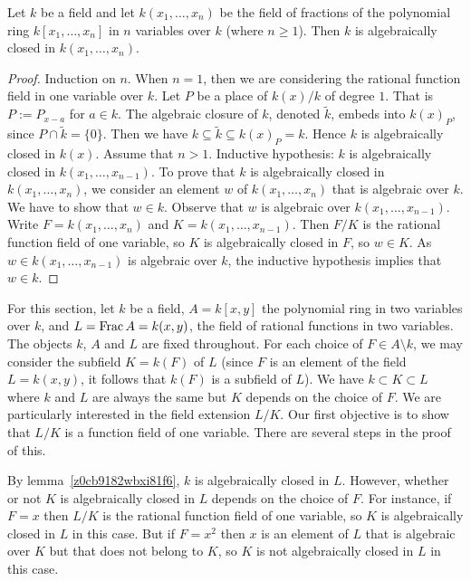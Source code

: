 \begin{lemma} \label {z0cb9182wbxi81f6}
	Let $k$ be a field and let $k(x_1, \dots, x_n)$ be 
	the field of fractions of the
	polynomial ring  $k[x_1, \dots, x_n]$ in $n$ variables 
	over $k$ (where $n \ge 1$).
	Then $k$ is algebraically closed in $k(x_1, \dots, x_n)$.
\end{lemma}

\begin{proof}
	Induction on $n$. When $n= 1$, then we are considering 
	the rational function field in one variable over $k $.
	Let $P$ be a place of $k(x)/k$ of degree $1$. That is
	$P:=P_{x-a}$ for $a \in k$. The algebraic closure of 
	$k$, denoted $\tilde{k}$, embeds into $k(x)_P$, since 
	$P \cap \tilde{k} = \lbrace 0 \rbrace$. Then we have 
	$k \subseteq \tilde{k} \subseteq k(x)_P = k$. 
	Hence $k$ is algebraically closed in $k(x)$. 
	Assume that $n>1$.
	Inductive hypothesis: $k$ is algebraically closed 
	in $k(x_1, \dots, x_{n-1})$.
	To prove that $k$ is algebraically closed in $k(x_1, \dots, x_n)$, we consider
	an element $w$ of $k(x_1, \dots, x_n)$ that is algebraic 
	over $k$. We have to show that $w \in k$.
	Observe that $w$ is algebraic over $k(x_1, \dots, x_{n-1})$.
	Write $F = k(x_1, \dots, x_{n})$ and $K = k(x_1, \dots, x_{n-1})$.
	Then $F/K$ is the rational function field of one variable, 
	so $K$ is algebraically closed in $F$, so $w \in K$.
	As $w \in k(x_1, \dots, x_{n-1})$ is algebraic over $k$, 
	the inductive hypothesis implies that $w \in k$.
\end{proof}

For this section, let $ k$ be a field, $A =  k[x,y]$ 
the polynomial ring in two variables over $ k$,
and $L= \operatorname{{\rm Frac}} A =  k(x,y)$, the field of rational functions in two variables.
The objects $ k$, $A$ and $L$ are fixed throughout.
For each choice of $F \in A \setminus  k$, 
we may consider the subfield $K= k(F)$ of $L$
(since $F$ is an element of the field $L =  k(x,y)$, 
it follows that $ k(F)$ is a subfield of $L$).
We have $ k \subset K \subset L$ where $ k$ 
and $L$ are always the same but $K$ depends on the choice of $F$.
We are particularly interested in the field extension $L/K$.
Our first objective is to show that $L/K$ is a function field 
of one variable.
There are several steps in the proof of this.

\begin{remark}
	By lemma~\ref{z0cb9182wbxi81f6}, $ k$ is algebraically closed in $L$.
	However, whether or not $K$ is algebraically closed in $L$ depends on the choice of $F$.
	For instance, if $F=x$ then $L/K$ is the rational function field of one variable, so $K$ is algebraically closed 
	in $L$ in this case.  But if $F = x^2$ then $x$ is an element of $L$ that is algebraic over $K$ but that does not 
	belong to $K$, so $K$ is not algebraically closed in $L$ in this case.
\end{remark}

